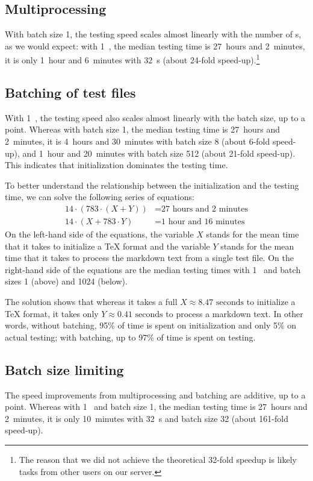 \documentclass[final]{ltugboat}
\begin{document}
\subsection{Multiprocessing}
With batch size 1, the testing speed scales almost linearly with the number of s, as we would expect: with 1~, the median testing time is 27~hours and 2~minutes, it is only 1~hour and 6~minutes with 32~s (about 24-fold speed-up).\footnote{%
The reason that we did not achieve the theoretical 32-fold speedup is likely tasks from other users on our server.%
}

\subsection{Batching of test files}
With 1~, the testing speed also scales almost linearly with the batch size, up to a point. Whereas with batch size 1, the median testing time is 27~hours and 2~minutes, it is 4~hours and 30~minutes with batch size 8 (about 6-fold speed-up), and 1~hour and 20~minutes with batch size 512 (about 21-fold speed-up). This indicates that initialization dominates the testing time.

To better understand the relationship between the initialization and the testing time, we can solve the following series of equations:
\begin{align*}
    14\cdot(783\cdot(X + Y)) &= \text{27 hours and 2 minutes} \\
    14\cdot(X + 783\cdot Y) &= \text{1 hour and 16 minutes}
\end{align*}
On the left-hand side of the equations, the variable $X$ stands for the mean time that it takes to initialize a \TeX{} format and the variable $Y$ stands for the mean time that it takes to process the markdown text from a single test file. On the right-hand side of the equations are the median testing times with 1~ and batch sizes 1 (above) and 1024 (below).

The solution shows that whereas it takes a full $X\approx\text{8.47 seconds}$ to initialize a \TeX{} format, it takes only $Y\approx\text{0.41 seconds}$ to process a markdown text. In other words, without batching, 95\% of time is spent on initialization and only 5\% on actual testing; with batching, up to 97\% of time is spent on testing.

\subsection{Batch size limiting}
The speed improvements from multiprocessing and batching are additive, up to a point. Whereas with 1~ and batch size 1, the median testing time is 27~hours and 2~minutes, it is only 10~minutes with 32~s and batch size 32 (about 161-fold speed-up).
\end{document}
